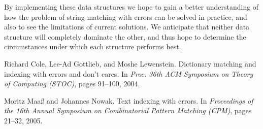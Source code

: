 \documentclass[11pt]{article}
\begin{document}
By implementing these data structures we hope to gain a better understanding of how the problem of string matching with errors can be solved in practice, and also to see the limitations of current solutions.
We anticipate that neither data structure will completely dominate the other, and thus hope to determine the circumstances under which each structure performs best.

\begin{thebibliography}{9}
Richard Cole, Lee-Ad Gottlieb, and Moshe Lewenstein.
 Dictionary matching and indexing with errors and don't cares.
 In \textit{Proc. 36th ACM Symposium on Theory of Computing (STOC)},
 pages 91--100, 2004.
 
Moritz Maa{\ss} and Johannes Nowak.
 Text indexing with errors.
 In \textit{Proceedings of the 16th Annual Symposium on Combinatorial Pattern Matching (CPM)},
 pages 21--32, 2005.
 
\end{thebibliography}
\end{document}
